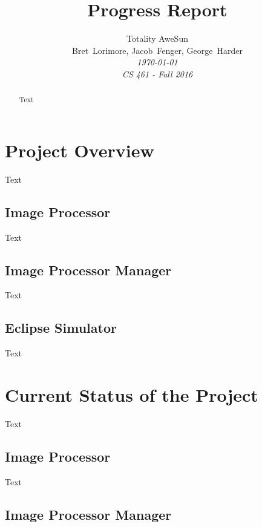 \documentclass[10pt, onecolumn, draftclsnofoot, letterpaper, compsoc]{IEEEtran}
\title{Progress Report}
\author{Totality AweSun \\
		Bret~Lorimore, Jacob~Fenger, George~Harder \\
		\textit{\today \\
		CS 461 - Fall 2016}}
\begin{document}
\maketitle

\begin{abstract}

Text

\end{abstract}

\newpage

\tableofcontents

\newpage

\section{Project Overview}

Text

\subsection{Image Processor}

Text

\subsection{Image Processor Manager}

Text

\subsection{Eclipse Simulator}

Text


\section{Current Status of the Project}

Text

\subsection{Image Processor}

Text

\subsection{Image Processor Manager}
\end{document}
